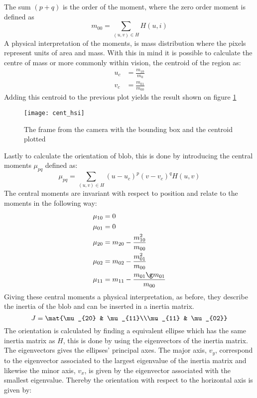 The sum $(p+q)$ is the order of the moment, where the zero order moment is defined as
\begin{equation}
m_{00}=\sum_{(u,v)\in H}H(u,i)
\end{equation}
A physical interpretation of the moments, is mass distribution where the pixels represent units of area and mass. With this in mind it is possible to calculate the centre of mass or more commonly within vision, the centroid of the region as:
\begin{align}
u_c&=\frac{m_{10}}{m_{0}}\\[0.5em]
v_c&=\frac{m_{01}}{m_{00}}
\end{align}  
Adding this centroid to the previous plot yields the result shown on figure \ref{fig_cent}
\begin{figure}[htpb!]
	\centering
	\texttt{[image: cent\_hsi]}
	\caption{The frame from the camera with the bounding box and the centroid plotted}
	\label{fig_cent}
\end{figure}
Lastly to calculate the orientation of blob, this is done by introducing the central moments $\mu_{pq}$ defined as:
\begin{equation}
\mu_{pq}=\sum_{(u,v)\in H} (u-u_c)^p(v-v_c)^qH(u,v)
\end{equation}
The central moments are invariant with respect to position and relate to the moments in the following way:
\begin{align}
\mu_{10}&=0\\
\mu_{01}&=0\\
\mu_{20}&=m_{20}-\frac{m_{10}^2}{m_{00}}\\
\mu_{02}&=m_{02}-\frac{m_{01}^2}{m_{00}}\\
\mu_{11}&=m_{11}-\frac{m_{01}\g m_{01}}{m_{00}}
\end{align}
Giving these central moments a physical interpretation, as before, they describe the inertia of the blob and can be inserted in a inertia matrix.
\begin{equation}
J=\mat{\mu_{20} & \mu_{11}\\\mu_{11} & \mu_{02}}
\end{equation}  
The orientation is calculated by finding a equivalent ellipse which has the same inertia matrix as $H$, this is done by using the  eigenvectors of the inertia matrix. The eigenvectors gives the ellipses' principal axes. The major axis, $v_y$, correspond to the eigenvector associated to the largest eigenvalue of the inertia matrix and likewise the minor axis, $v_x$, is given by the eigenvector associated with the smallest eigenvalue. Thereby the orientation with respect to the horizontal axis is given by:
